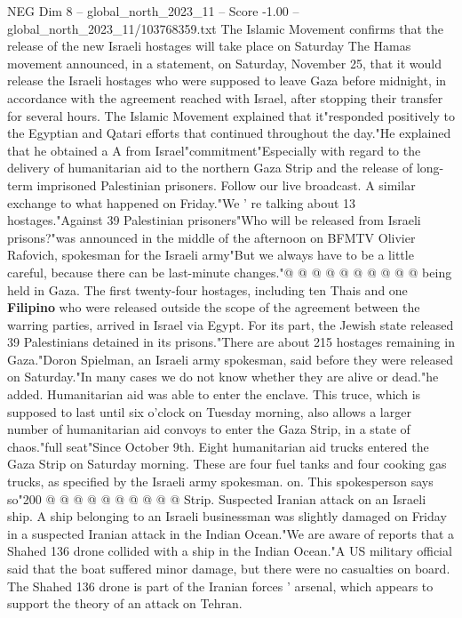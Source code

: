 \begin{textsample}{NEG Dim 8 – global\_north\_2023\_11 – Score -1.00 – global\_north\_2023\_11/103768359.txt}  \label{ex:f8_neg_261}
The Islamic Movement confirms that the release of the new Israeli hostages will take place on Saturday The Hamas movement announced, in a statement, on Saturday, November 25, that it would release the Israeli hostages who were supposed to leave Gaza before midnight, in accordance with the agreement reached with Israel, after stopping their transfer for several hours.
The Islamic Movement explained that it"responded positively to the Egyptian and Qatari efforts that continued throughout the day."He explained that he obtained a A from Israel"commitment"Especially with regard to the delivery of humanitarian aid to the northern Gaza Strip and the release of long-term imprisoned Palestinian prisoners.
Follow our live broadcast.
A similar exchange to what happened on Friday."We ' re talking about 13 hostages."Against 39 Palestinian prisoners"Who will be released from Israeli prisons?"was announced in the middle of the afternoon on BFMTV Olivier Rafovich, spokesman for the Israeli army"But we always have to be a little careful, because there can be last-minute changes."@ @ @ @ @ @ @ @ @ @ being held in Gaza.
The first twenty-four hostages, including ten Thais and one \textbf{Filipino} who were released outside the scope of the agreement between the warring parties, arrived in Israel via Egypt.
For its part, the Jewish state released 39 Palestinians detained in its prisons."There are about 215 hostages remaining in Gaza."Doron Spielman, an Israeli army spokesman, said before they were released on Saturday."In many cases we do not know whether they are alive or dead."he added.
Humanitarian aid was able to enter the enclave.
This truce, which is supposed to last until six o'clock on Tuesday morning, also allows a larger number of humanitarian aid convoys to enter the Gaza Strip, in a state of chaos."full seat"Since October 9th.
Eight humanitarian aid trucks entered the Gaza Strip on Saturday morning.
These are four fuel tanks and four cooking gas trucks, as specified by the Israeli army spokesman. on.
This spokesperson says so"200 @ @ @ @ @ @ @ @ @ @ Strip.
Suspected Iranian attack on an Israeli ship.
A ship belonging to an Israeli businessman was slightly damaged on Friday in a suspected Iranian attack in the Indian Ocean."We are aware of reports that a Shahed 136 drone collided with a ship in the Indian Ocean."A US military official said that the boat suffered minor damage, but there were no casualties on board.
The Shahed 136 drone is part of the Iranian forces ' arsenal, which appears to support the theory of an attack on Tehran.

\end{textsample}
